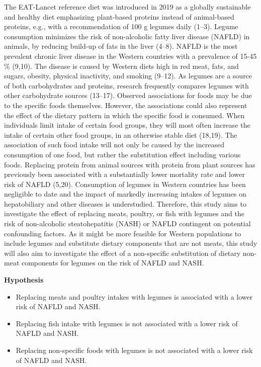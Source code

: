 \documentclass[
  11pt,
  a4paper,
  DIV=11,
  numbers=noendperiod,
  twocolumn]{scrartcl}
\begin{document}
The EAT-Lancet reference diet was introduced in 2019 as a globally
sustainable and healthy diet emphasizing plant-based proteins instead of
animal-based proteins, e.g., with a recommendation of 100 g legumes
daily (1--3). Legume consumption minimizes the risk of non-alcoholic
fatty liver disease (NAFLD) in animals, by reducing build-up of fats in
the liver (4--8). NAFLD is the most prevalent chronic liver disease in
the Western countries with a prevalence of 15-45 \% (9,10). The disease
is caused by Western diets high in red meat, fats, and sugars, obesity,
physical inactivity, and smoking (9--12). As legumes are a source of
both carbohydrates and proteins, research frequently compares legumes
with other carbohydrate sources (13--17). Observed associations for
foods may be due to the specific foods themselves. However, the
associations could also represent the effect of the dietary pattern in
which the specific food is consumed. When individuals limit intake of
certain food groups, they will most often increase the intake of certain
other food groups, in an otherwise stable diet (18,19). The association
of such food intake will not only be caused by the increased consumption
of one food, but rather the substitution effect including various foods.
Replacing protein from animal sources with protein from plant sources
has previously been associated with a substantially lower mortality rate
and lower risk of NAFLD (5,20). Consumption of legumes in Western
countries has been negligible to date and the impact of markedly
increasing intakes of legumes on hepatobiliary and other diseases is
understudied. Therefore, this study aims to investigate the effect of
replacing meats, poultry, or fish with legumes and the risk of
non-alcoholic steatohepatitis (NASH) or NAFLD contingent on potential
confounding factors. As it might be more feasible for Western
populations to include legumes and substitute dietary components that
are not meats, this study will also aim to investigate the effect of a
non-specific substitution of dietary non-meat components for legumes on
the risk of NAFLD and NASH.

\textbf{Hypothesis}

\begin{itemize}
\item
  Replacing meats and poultry intakes with legumes is associated with a
  lower risk of NAFLD and NASH.
\item
  Replacing fish intake with legumes is not associated with a lower risk
  of NAFLD and NASH.
\item
  Replacing non-specific foods with legumes is not associated with a
  lower risk of NAFLD and NASH.
\end{itemize}
\end{document}
